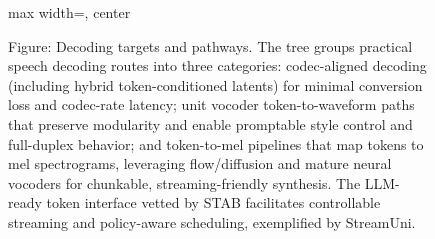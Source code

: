 \begin{figure}[h]
\begin{adjustbox}{max width=\textwidth, center}
\begin{tikzpicture}
\end{tikzpicture}
\end{adjustbox}

\caption{Figure: Decoding targets and pathways. The tree groups practical speech decoding routes into three categories: codec-aligned decoding (including hybrid token-conditioned latents) for minimal conversion loss and codec-rate latency; unit vocoder token-to-waveform paths that preserve modularity and enable promptable style control and full-duplex behavior; and token-to-mel pipelines that map tokens to mel spectrograms, leveraging flow/diffusion and mature neural vocoders for chunkable, streaming-friendly synthesis. The LLM-ready token interface vetted by STAB facilitates controllable streaming and policy-aware scheduling, exemplified by StreamUni.}
\label{fig:tiny_tree_figure_2}

\end{figure}